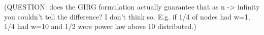 (QUESTION: does the GIRG formulation actually guarantee that as n -> infinity you couldn't tell the difference? I don't think so. E.g. if 1/4 of nodes had w=1, 1/4 had w=10 and 1/2 were power law above 10 distributed.)


\begin{comment}
Integrating $\int_w w^{-\tau} \PP(\Poisson(\Theta(w)) = x) dw$ gives $\E[dd(x)] = \Theta(x^{-\tau})$, for large $x$, dropping smaller order terms.


If instead, independently, each $d_u = \E[\Poisson(\Theta(w_u))] = \Theta(w_u)$, then we would sort of be able to say that the degree distribution follows a $\tau$ exponentiated power law distribution.
We would argue that independently, $P(d_u=m) \approxeq \Theta( \int_{m-1/2}^{m+1/2} w^{-\tau}) = \Theta(m^{-\tau})$, and hence that $dd(m) \sim \frac{Bin(n, m^{-\tau})}{n} \to N(m^{-\tau}, \frac{m^{-\tau}(1- m^{-\tau})}{n}) \approxeq m^{-\tau}$.

Ok so now if $d_u \sim \Poisson(\Theta(w_u))$, can we then derive $\PP(d_u = d)$? $\PP(d_u = d) = \int_W \PP(d_u = d | w_u = w) p(w) dw$. For large $w$, we approximate $\Poisson(\Theta(w_u)) \approxeq N(\Theta(w_u), \Theta(w_u))$. Hence we get $\PP(d_u = d) \propto \int_W \exp(-\frac{(w-d)^2}{2w}) w^{-\tau} dw$. We approximate this integral to be dominated by the interval $w \in [d - k\sqrt{d}, d + k\sqrt{d}]$ for sufficiently large $k$.

So we get $\PP(d_u = d) \propto \int_{d - k\sqrt{d}}^{d + k\sqrt{d}} \exp(-\frac{(w-d)^2}{2w}) w^{-\tau} dw \approxeq \int_{d - k\sqrt{d}}^{d + k\sqrt{d}} \exp(-\frac{(w-d)^2}{2d}) w^{-\tau} dw$. 

Substitute in $x = w - d$ to get $\int_{-k \sqrt{d}}^{k \sqrt{d}} (d + x)^{-\tau} e^{-x^2/2d}dx$.

Then using $(d + x)^{-\tau} = d^{-\tau} (1 + \frac{x}{d})^{-\tau} \approxeq d^{-\tau} (1 - \frac{\tau x}{d} + \frac{\tau(\tau+1)}{2} \frac{x^2}{d^2})$ for $x \in [-k \sqrt{d}, k \sqrt{d}]$, we get $\int_{-k \sqrt{d}}^{k \sqrt{d}} (d + x)^{-\tau} e^{-x^2/2d}dx \approxeq d^{-\tau} \int_{-k \sqrt{d}}^{k \sqrt{d}} (1 - \frac{\tau x}{d} + \frac{\tau(\tau+1)}{2} \frac{x^2}{d^2}) e^{-x^2/2d}dx$.

Finally we can use the results on the pdf of a normal distribution integrating to $1$; the mean integrating to $0$, and the variance integrating to $\sigma^2$, to get that $\PP(d_u = d) \propto d^{-\tau} (1 + \frac{\tau(\tau + 1)}{2} d^{-2} d) = d^{-\tau} 1 + \frac{\tau(\tau + 1)}{2} d^{-(\tau + 1)}$. This formula is essentially a weighted average between two different power law distributions. As $d \to \infty$ it will actually be correct, and be dominated by the larger $d^{-\tau}$ term. However for not so large $d$, it will be more a mix, and so the "perceived/empirical" powerlaw exponent could look larger, presumably somewhere in $[\tau, \tau + 1]$.



\end{comment}
